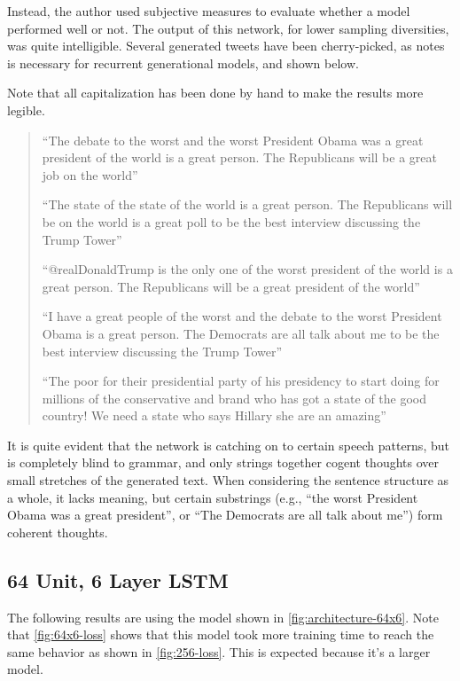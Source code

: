 \documentclass[letterpaper]{article}
\begin{document}
        Instead, the author used subjective measures to evaluate whether a model performed well or not. The output of this network, for lower sampling diversities, was quite intelligible. Several generated tweets have been cherry-picked, as \citet{karpathy_2015} notes is necessary for recurrent generational models, and shown below.

        Note that all capitalization has been done by hand to make the results more legible.

        \begin{quote}
            ``The debate to the worst and the worst President Obama was a great president of the world is a great person. The Republicans will be a great job on the world''

            ``The state of the state of the world is a great person. The Republicans will be on the world is a great poll to be the best interview discussing the Trump Tower''

            ``@realDonaldTrump is the only one of the worst president of the world is a great person. The Republicans will be a great president of the world''

            ``I have a great people of the worst and the debate to the worst President Obama is a great person. The Democrats are all talk about me to be the best interview discussing the Trump Tower''

            ``The poor for their presidential party of his presidency to start doing for millions of the conservative and brand who has got a state of the good country! We need a state who says Hillary she are an amazing''
        \end{quote}

        It is quite evident that the network is catching on to certain speech patterns, but is completely blind to grammar, and only strings together cogent thoughts over small stretches of the generated text. When considering the sentence structure as a whole, it lacks meaning, but certain substrings (e.g., ``the worst President Obama was a great president'', or ``The Democrats are all talk about me'') form coherent thoughts.

    \subsection{64 Unit, 6 Layer LSTM}
        The following results are using the model shown in \autoref{fig:architecture-64x6}. Note that \autoref{fig:64x6-loss} shows that this model took more training time to reach the same behavior as shown in \autoref{fig:256-loss}. This is expected because it's a larger model.
\end{document}
